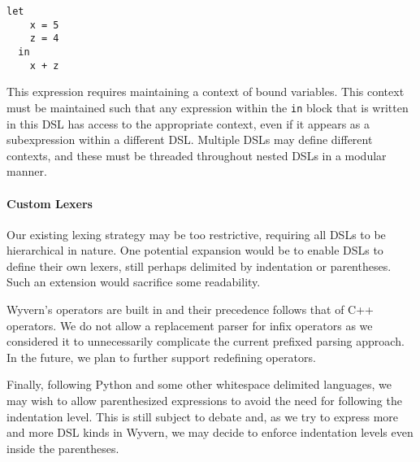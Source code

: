\begin{lstlisting}
let 
    x = 5
    z = 4
  in
    x + z
\end{lstlisting}

\noindent 
This expression requires maintaining a context of bound variables. This context must be maintained such that any expression within the \verb|in| block that is written in this DSL has access to the appropriate context, even if it appears as a subexpression within a different DSL. Multiple DSLs may define different contexts, and these must be threaded throughout nested DSLs in a modular manner.

\paragraph{Custom Lexers} 
Our existing lexing strategy may be too restrictive, requiring all DSLs to be hierarchical in nature. One potential expansion would be to enable DSLs to define their own lexers, still perhaps delimited by indentation or parentheses. Such an extension would sacrifice some readability.

Wyvern's operators are built in and their precedence follows that of
C++ operators. We do not allow a replacement parser for infix
operators as we considered it to unnecessarily complicate the current
prefixed parsing approach. In the future, we plan to further support
redefining operators.

Finally, following Python and some other whitespace delimited
languages, we may wish to allow parenthesized expressions to avoid the need for
following the indentation level. This is still subject to debate and,
as we try to express more and more DSL kinds in Wyvern, we may decide
to enforce indentation levels even inside the parentheses.
